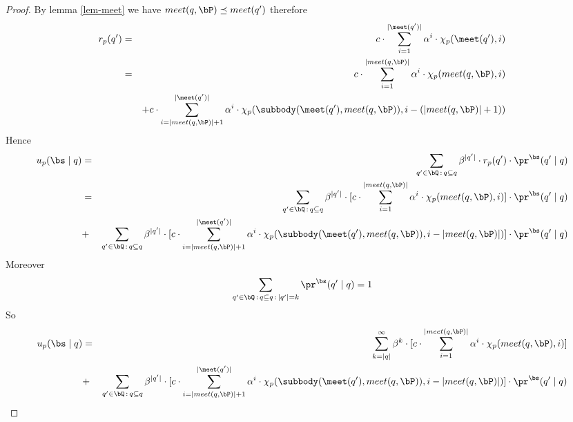 \begin{proof}
	By lemma \ref{lem-meet} we have $meet(q,\bP) \preceq meet(q')$ therefore
	\begin{eqnarray*}
		r_p(q') & = &{\displaystyle c \cdot \sum_{i=1}^{|\meet(q')|} \alpha^i \cdot \chi_p(\meet(q'),i)} \\
		& = & {\displaystyle c \cdot \sum_{i=1}^{|meet(q,\bP)|} \alpha^i \cdot \chi_p(meet(q,\bP),i) } \\
		&&	+ {\displaystyle c \cdot \sum_{i=|meet(q,\bP)|+1}^{|\meet(q')|} \alpha^{i} \cdot \chi_p(\subbody(\meet(q'),meet(q,\bP)),i-(|meet(q,\bP)|+1))  }   \\
	\end{eqnarray*}
	Hence 
	\begin{eqnarray*}
		u_p(\bs \mid q)& = & \sum_{q' \in \bQ \,:\, q \subseteq q} \beta^{|q'|} \cdot  r_p(q') \cdot \pr^{\bs}(q' \mid q) \\ 
		& = & \sum_{q' \in \bQ \,:\, q \subseteq q} \beta^{|q'|} \cdot  [{\displaystyle c \cdot \sum_{i=1}^{|meet(q,\bP)|} \alpha^i \cdot \chi_p(meet(q,\bP),i) }] \cdot \pr^{\bs}(q' \mid q) \\
		&+ & \sum_{q' \in \bQ \,:\, q \subseteq q} \beta^{|q'|} \cdot  [{\displaystyle c \cdot \sum_{i=|meet(q,\bP)|+1}^{|\meet(q')|} \alpha^{i} \cdot \chi_p(\subbody(\meet(q'),meet(q,\bP)),i-|meet(q,\bP)|)  }] \cdot \pr^{\bs}(q' \mid q) \\
	\end{eqnarray*}
	Moreover $$ \sum_{q' \in \bQ \,:\, q \subseteq q \,:\, |q'| =k}  \pr^{\bs}(q' \mid q) = 1$$
	So 
	\begin{eqnarray*}
		u_p(\bs \mid q) & = & \sum_{k = |q|}^{\infty} \beta^{k} \cdot  [{\displaystyle c \cdot \sum_{i=1}^{|meet(q,\bP)|} \alpha^i \cdot \chi_p(meet(q,\bP),i) }] \\
		&+ & \sum_{q' \in \bQ \,:\, q \subseteq q} \beta^{|q'|} \cdot  [{\displaystyle c \cdot \sum_{i=|meet(q,\bP)|+1}^{|\meet(q')|} \alpha^{i} \cdot \chi_p(\subbody(\meet(q'),meet(q,\bP)),i-|meet(q,\bP)|)  }] \cdot \pr^{\bs}(q' \mid q) \\
	\end{eqnarray*}
	

\end{proof}
